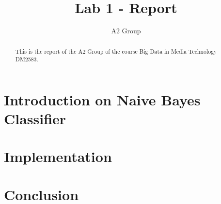 \documentclass[a4paper]{article}
\title{Lab 1 - Report}
\author{A2 Group}
\begin{document}
\maketitle

\begin{abstract}
This is the report of the A2 Group of the course Big Data in Media Technology DM2583.
\end{abstract}

\section{Introduction on Naive Bayes Classifier}


\section{Implementation}



\section{Conclusion}





\end{document}
